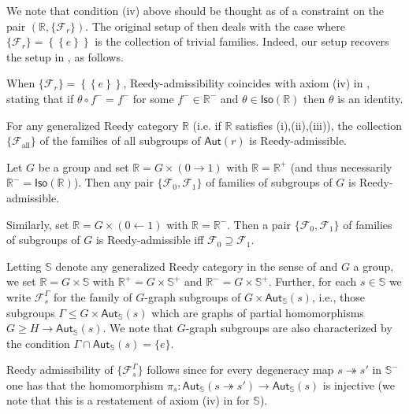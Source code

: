 \documentclass[a4paper,10pt
]{article}%
\begin{document}
We note that condition (iv) above should be thought as of a constraint on the pair 
$(\mathbb{R},\{\mathcal{F}_r\})$.
The original setup of \cite{BM11} then deals with the case
where $\{ \mathcal{F}_r \} =
 \left\{ \left\{ e \right\} \right\}$
is the collection of trivial families. Indeed, our setup recovers
the setup in \cite{BM11}, as follows.

\begin{example}
	When $\{ \mathcal{F}_r \} =
 \left\{ \left\{ e \right\} \right\}$, Reedy-admissibility coincides with axiom (iv) in \cite[Def. 1.1]{BM11},
stating that if $\theta \circ f^{-} = f^{-}$
for some $f^- \in \mathbb{R}^{-}$ and 
$\theta \in \mathsf{Iso}(\mathbb{R})$ then $\theta$ is an identity.
\end{example}

\begin{example}
For any generalized Reedy category $\mathbb{R}$
(i.e. if $\mathbb{R}$ satisfies (i),(ii),(iii)),
the collection $\{\mathcal{F}_{\text{all}}\}$
of the families of all subgroups of $\mathsf{Aut}(r)$
is Reedy-admissible.
\end{example}

\begin{example}
	Let $G$ be a group and set $\mathbb{R} = G \times (0 \to 1)$ with $\mathbb{R} = \mathbb{R}^+$
	(and thus necessarily $\mathbb{R}^- = \mathsf{Iso}(\mathbb{R})$).
	Then any pair 
	$\{\mathcal{F}_0,\mathcal{F}_1\}$
	of families of subgroups of $G$ is Reedy-admissible.
	
	Similarly, set $\mathbb{R} = G \times (0 \leftarrow 1)$
	with $\mathbb{R} = \mathbb{R}^-$. Then a pair
	$\{\mathcal{F}_0,\mathcal{F}_1\}$
	of families of subgroups of $G$ is Reedy-admissible
	iff $\mathcal{F}_0 \supseteq \mathcal{F}_1$.
\end{example}


\begin{example}\label{GGRAPHREEDY EX}
	Letting $\mathbb{S}$ denote any generalized Reedy category in the sense of \cite[Def. 1.1]{BM11} and $G$ a group,
	we set $\mathbb{R} = G \times \mathbb{S}$
	with $\mathbb{R}^+ = G \times \mathbb{S}^+$ and 
	$\mathbb{R}^- = G \times \mathbb{S}^+$.
	Further, for each $s \in \mathbb{S}$ we write
	$\mathcal{F}_s^{\Gamma}$ for the family of 
	$G$-graph subgroups of $G \times \mathsf{Aut}_{\mathbb{S}}(s)$, i.e., those subgroups 
	$\Gamma \leq G \times \mathsf{Aut}_{\mathbb{S}}(s)$ 
	which are graphs of partial homomorphisms
	$G \geq H \to \mathsf{Aut}_{\mathbb{S}}(s)$. We note that $G$-graph subgroups are also characterized by the condition $\Gamma \cap \mathsf{Aut}_{\mathbb{S}}(s) = \{e\}$.
	
	Reedy admissibility of $\{\mathcal{F}_s^{\Gamma}\}$ follows since for every degeneracy map 
	$s \twoheadrightarrow s'$ in $\mathbb{S}^-$ one has that the homomorphism
	$\pi_s \colon \mathsf{Aut}_{\mathbb{S}}(s \twoheadrightarrow s')
	\to \mathsf{Aut}_{\mathbb{S}}(s)$ is injective
	(we note that this is a restatement of axiom (iv) in \cite[Def. 1.1]{BM11} for $\mathbb{S}$).
\end{example}
\end{document}
